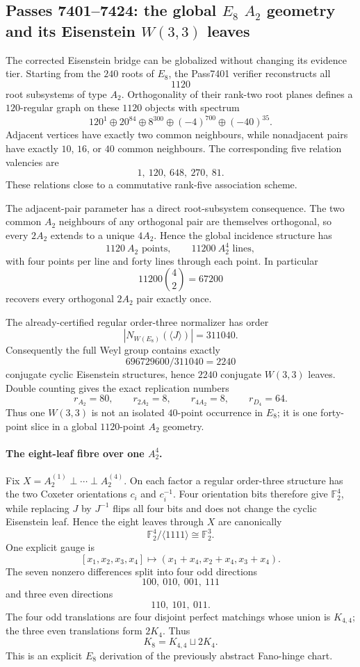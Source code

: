 \subsection*{Passes 7401--7424: the global $E_8$ $A_2$ geometry and its Eisenstein $W(3,3)$ leaves}

The corrected Eisenstein bridge can be globalized without changing its evidence tier.
Starting from the $240$ roots of $E_8$, the Pass7401 verifier reconstructs all
\[
1120
\]
root subsystems of type $A_2$.  Orthogonality of their rank-two root planes defines
a $120$-regular graph on these $1120$ objects with spectrum
\[
\boxed{120^1\oplus20^{84}\oplus8^{300}\oplus(-4)^{700}\oplus(-40)^{35}}.
\]
Adjacent vertices have exactly two common neighbours, while nonadjacent pairs have
exactly $10$, $16$, or $40$ common neighbours.  The corresponding five relation
valencies are
\[
\boxed{1,\ 120,\ 648,\ 270,\ 81}.
\]
These relations close to a commutative rank-five association scheme.

The adjacent-pair parameter has a direct root-subsystem consequence.  The two common
$A_2$ neighbours of any orthogonal pair are themselves orthogonal, so every $2A_2$
extends to a unique $4A_2$.  Hence the global incidence structure has
\[
\boxed{1120\ A_2\text{ points},\qquad11200\ A_2^4\text{ lines},}
\]
with four points per line and forty lines through each point.  In particular
\[
11200\binom42=67200
\]
recovers every orthogonal $2A_2$ pair exactly once.

The already-certified regular order-three normalizer has order
\[
|N_{W(E_8)}(\langle J\rangle)|=311040.
\]
Consequently the full Weyl group contains exactly
\[
\boxed{696729600/311040=2240}
\]
conjugate cyclic Eisenstein structures, hence $2240$ conjugate $W(3,3)$ leaves.
Double counting gives the exact replication numbers
\[
\boxed{r_{A_2}=80,\qquad r_{2A_2}=8,\qquad r_{4A_2}=8,\qquad r_{D_4}=64.}
\]
Thus one $W(3,3)$ is not an isolated $40$-point occurrence in $E_8$; it is one
forty-point slice in a global $1120$-point $A_2$ geometry.

\paragraph{The eight-leaf fibre over one $A_2^4$.}
Fix $X=A_2^{(1)}\perp\cdots\perp A_2^{(4)}$.  On each factor a regular order-three
structure has the two Coxeter orientations $c_i$ and $c_i^{-1}$.  Four orientation
bits therefore give $\mathbb F_2^4$, while replacing $J$ by $J^{-1}$ flips all four
bits and does not change the cyclic Eisenstein leaf.  Hence the eight leaves through
$X$ are canonically
\[
\boxed{\mathbb F_2^4/\langle1111\rangle\cong\mathbb F_2^3.}
\]
One explicit gauge is
\[
[x_1,x_2,x_3,x_4]\longmapsto(x_1+x_4,x_2+x_4,x_3+x_4).
\]
The seven nonzero differences split into four odd directions
\[
100,\ 010,\ 001,\ 111
\]
and three even directions
\[
110,\ 101,\ 011.
\]
The four odd translations are four disjoint perfect matchings whose union is
$K_{4,4}$; the three even translations form $2K_4$.  Thus
\[
\boxed{K_8=K_{4,4}\sqcup2K_4.}
\]
This is an explicit $E_8$ derivation of the previously abstract Fano-hinge chart.

